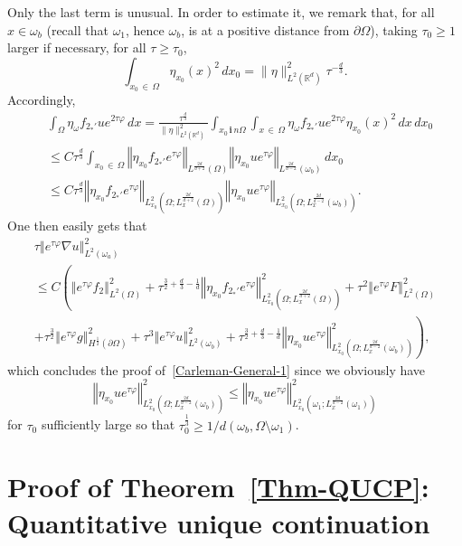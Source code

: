 \documentclass[AHL,Unicode,longabstracts]{cedram}
\newcommand*\R{\mathbb{R}}
\renewcommand{\i}{\mathbf{i}}
\newcommand{\norm}[1]{\left\Vert#1\right\Vert}
\renewcommand{\leq}{\leqslant}
\renewcommand{\geq}{\geqslant}
\begin{document}
Only the last term is unusual. In order to estimate it, we remark that, for all $x \in \omega_b$ (recall that $\omega_{1}$, hence $\omega_b$, is at a positive distance from $\partial \Omega$), taking $\tau_0\geq 1$ larger if necessary, for all $\tau \geq \tau_0$,
\[
\int_{x_0\, \in\, \Omega} \eta_{x_0}(x)^2 \, dx_0 = \| \eta\|_{L^2\left(\R^d\right)}^2 \tau^{-\frac{d}{3}}.
\]
Accordingly,
\begin{align*}
& \int_{\Omega} \eta_\omega f_{2_*'} u e^{2 \tau \varphi} \, dx =
\frac{\tau^{\frac{d}{3}}}{\| \eta\|_{L^2(\R^d)}^2} \int_{ x_0\, \i\,n \Omega} \int_{x\, \in\, \Omega} \eta_\omega f_{2_*'} u e^{2 \tau \varphi} \eta_{x_0}(x)^2 \, dx \, dx_0
\\
&\leq C \tau^{\frac{d}{3}} \int_{x_0\,\in\, \Omega} \norm{\eta_{x_0} f_{2_*'}e^{\tau \varphi}}_{L^{\frac{2d}{d+2}}(\Omega)}
\norm{ \eta_{x_0} u e^{\tau \varphi}}_{L^{\frac{2d}{d-2}}(\omega_b)} \, dx_0
\\
&\leq C \tau^{\frac{d}{3}} \norm{\eta_{x_0} f_{2_*'}e^{\tau \varphi}}_{L^2_{x_0}\left(\Omega; L^{\frac{2d}{d+2}}_x(\Omega)\right)} \norm{\eta_{x_0} u e^{\tau \varphi}}_{L^2_{x_0}\left(\Omega; L^{\frac{2d}{d-2}}_x(\omega_b)\right)}.
\end{align*}
One then easily gets that
\begin{multline*}
\tau \norm{ e^{\tau \varphi} \nabla u}_{L^2(\omega_a)}^2\\
 \leq  C  \left( 
\norm{e^{\tau \varphi} f_2 }_{L^2(\Omega)}^2\! +
\tau^{\frac{3}{2}+\frac{d}{3}-\frac{1}{d}} \norm{\eta_{x_0} f_{2_*'}e^{\tau \varphi}}_{L^2_{x_0}(\Omega; L^{\frac{2d}{d+2}}_x(\Omega))}^2 + 
\tau^2 \norm{e^{\tau \varphi} F }_{L^2(\Omega)}^2
\right.
\\
\left. +
\tau^{\frac{3}{2}} \norm{ e^{\tau \varphi} g }_{H^{\frac{1}{2}}(\partial \Omega)}^2 +
\tau^{3} \norm{ e^{\tau \varphi} u}_{L^2(\omega_b)}^2 +
\tau^{\frac{3}{2}+\frac{d}{3}-\frac{1}{d}} \norm{ \eta_{x_0} u e^{\tau \varphi}}_{L^2_{x_0}\left(\Omega; L^{\frac{2d}{d-2}}_x(\omega_b)\right)}^2
\right),
\end{multline*}
which concludes the proof of~\eqref{Carleman-General-1} since we obviously have
\[
\norm{ \eta_{x_0} u e^{\tau \varphi}}_{L^2_{x_0}\left(\Omega; L^{\frac{2d}{d-2}}_x(\omega_b)\right)}^2
\leq
\norm{\eta_{x_0} u e^{\tau \varphi}}_{L^2_{x_0}\left(\omega_1; L^{\frac{2d}{d-2}}_x(\omega_1)\right)}^2
\]
for $\tau_0$ sufficiently large so that $\tau_0^{\frac{1}{3}} \geq 1/ d(\omega_b, \Omega \setminus \omega_1)$.


\section{Proof of Theorem~\ref{Thm-QUCP}: Quantitative unique continuation} \label{Sec-Proof-Thm-QUCP}
\end{document}
